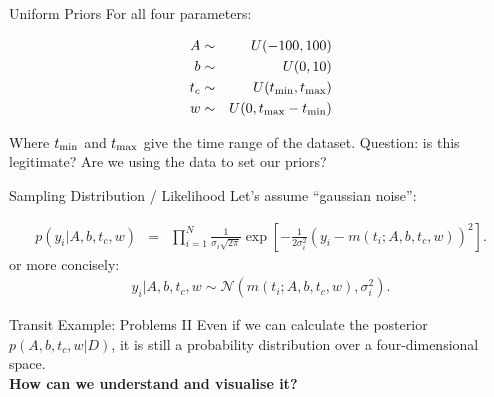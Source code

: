 \begin{frame}[t]{Uniform Priors}
For all four parameters:

\begin{eqnarray*}
A &\sim& U(-100, 100)\\
b &\sim& U(0, 10)\\
t_c &\sim& U(t_{\rm min}, t_{\rm max})\\
w &\sim& U(0, t_{\rm max} - t_{\rm min})
\end{eqnarray*}

Where $t_{\rm min}$ and $t_{\rm max}$ give the time range of the dataset.
Question: is this legitimate? Are we using the data to set our priors?

\end{frame}


\begin{frame}[t]{Sampling Distribution / Likelihood}
Let's assume ``gaussian noise'':

\begin{eqnarray*}
p(y_i | A, b, t_c, w) &=& \prod_{i=1}^N \frac{1}{\sigma_i\sqrt{2\pi}}
\exp\left[
-\frac{1}{2\sigma_i^2}\left(y_i - m(t_i; A, b, t_c, w)\right)^2
\right].
\end{eqnarray*}
or more concisely:
\begin{eqnarray*}
y_i | A, b, t_c, w \sim \mathcal{N}\left(m(t_i; A, b, t_c, w), \sigma_i^2\right).
\end{eqnarray*}

\end{frame}


\begin{frame}[fragile, t]{Transit Example: Problems II}
Even if we can calculate the posterior $p(A, b, t_c, w | D)$, it is still a
probability distribution over a four-dimensional space.\\
\vspace{20pt}
{\bf How can we understand and visualise it?}
\end{frame}




